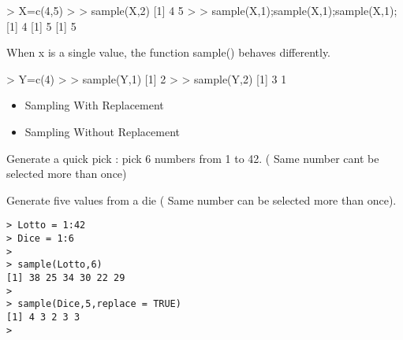 \documentclass[a4paper,12pt]{article}
\begin{document}
> X=c(4,5)
>
> sample(X,2)
[1] 4 5
>
> sample(X,1);sample(X,1);sample(X,1);
[1] 4
[1] 5
[1] 5

When x is a single value, the function sample() behaves differently.

> Y=c(4)
>
> sample(Y,1)
[1] 2
> 
> sample(Y,2)
[1] 3 1


\begin{itemize}
	\item Sampling With Replacement
	\item Sampling Without Replacement
\end{itemize}
Generate a quick pick : pick 6 numbers from 1 to 42. ( Same number cant be selected more than once)

Generate five values from a die ( Same number can be selected more than once).

\begin{verbatim}
> Lotto = 1:42
> Dice = 1:6
> 
> sample(Lotto,6)
[1] 38 25 34 30 22 29
> 
> sample(Dice,5,replace = TRUE)
[1] 4 3 2 3 3
>
\end{verbatim}
\end{document}
